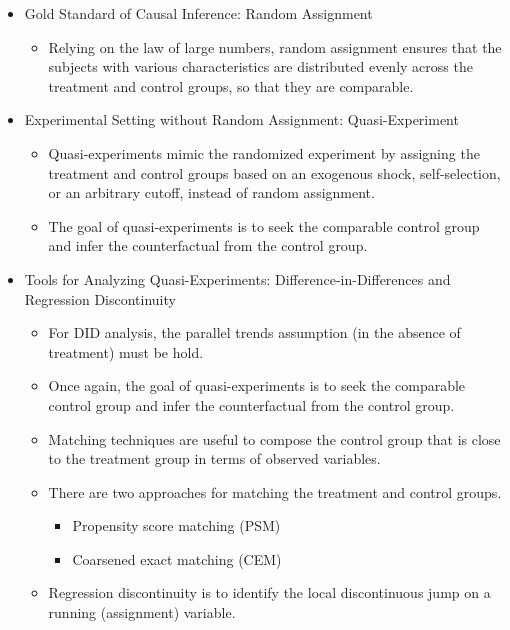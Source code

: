 \documentclass[
]{book}
\providecommand{\tightlist}{%
  \setlength{\itemsep}{0pt}\setlength{\parskip}{0pt}}
\theoremstyle{definition}
\theoremstyle{definition}
\theoremstyle{definition}
\theoremstyle{definition}
\theoremstyle{remark}
\begin{document}
\begin{itemize}
\tightlist
\item
  Gold Standard of Causal Inference: Random Assignment

  \begin{itemize}
  \tightlist
  \item
    Relying on the law of large numbers, random assignment ensures that the subjects with various characteristics are distributed evenly across the treatment and control groups, so that they are comparable.
  \end{itemize}
\item
  Experimental Setting without Random Assignment: Quasi-Experiment

  \begin{itemize}
  \tightlist
  \item
    Quasi-experiments mimic the randomized experiment by assigning the treatment and control groups based on an exogenous shock, self-selection, or an arbitrary cutoff, instead of random assignment.
  \item
    The goal of quasi-experiments is to seek the comparable control group and infer the counterfactual from the control group.
  \end{itemize}
\item
  Tools for Analyzing Quasi-Experiments: Difference-in-Differences and Regression Discontinuity

  \begin{itemize}
  \tightlist
  \item
    For DID analysis, the parallel trends assumption (in the absence of treatment) must be hold.
  \item
    Once again, the goal of quasi-experiments is to seek the comparable control group and infer the counterfactual from the control group.
  \item
    Matching techniques are useful to compose the control group that is close to the treatment group in terms of observed variables.
  \item
    There are two approaches for matching the treatment and control groups.

    \begin{itemize}
    \tightlist
    \item
      Propensity score matching (PSM)
    \item
      Coarsened exact matching (CEM)
    \end{itemize}
  \item
    Regression discontinuity is to identify the local discontinuous jump on a running (assignment) variable.
  \end{itemize}
\end{itemize}
\end{document}
